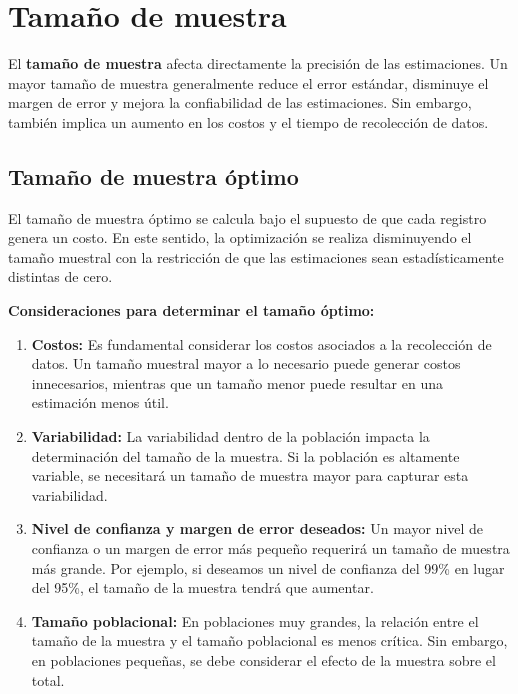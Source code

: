 \documentclass[
  letterpaper,
  DIV=11,
  numbers=noendperiod]{scrreprt}
\begin{document}
\chapter{Tamaño de muestra}\label{tamauxf1o-de-muestra}

El \textbf{tamaño de muestra} afecta directamente la precisión de las
estimaciones. Un mayor tamaño de muestra generalmente reduce el error
estándar, disminuye el margen de error y mejora la confiabilidad de las
estimaciones. Sin embargo, también implica un aumento en los costos y el
tiempo de recolección de datos.

\section{Tamaño de muestra óptimo}\label{tamauxf1o-de-muestra-uxf3ptimo}

El tamaño de muestra óptimo se calcula bajo el supuesto de que cada
registro genera un costo. En este sentido, la optimización se realiza
disminuyendo el tamaño muestral con la restricción de que las
estimaciones sean estadísticamente distintas de cero.

\textbf{Consideraciones para determinar el tamaño óptimo:}

\begin{enumerate}
\def\labelenumi{\arabic{enumi}.}
\item
  \textbf{Costos:} Es fundamental considerar los costos asociados a la
  recolección de datos. Un tamaño muestral mayor a lo necesario puede
  generar costos innecesarios, mientras que un tamaño menor puede
  resultar en una estimación menos útil.
\item
  \textbf{Variabilidad:} La variabilidad dentro de la población impacta
  la determinación del tamaño de la muestra. Si la población es
  altamente variable, se necesitará un tamaño de muestra mayor para
  capturar esta variabilidad.
\item
  \textbf{Nivel de confianza y margen de error deseados:} Un mayor nivel
  de confianza o un margen de error más pequeño requerirá un tamaño de
  muestra más grande. Por ejemplo, si deseamos un nivel de confianza del
  99\% en lugar del 95\%, el tamaño de la muestra tendrá que aumentar.
\item
  \textbf{Tamaño poblacional:} En poblaciones muy grandes, la relación
  entre el tamaño de la muestra y el tamaño poblacional es menos
  crítica. Sin embargo, en poblaciones pequeñas, se debe considerar el
  efecto de la muestra sobre el total.
\end{enumerate}
\end{document}
